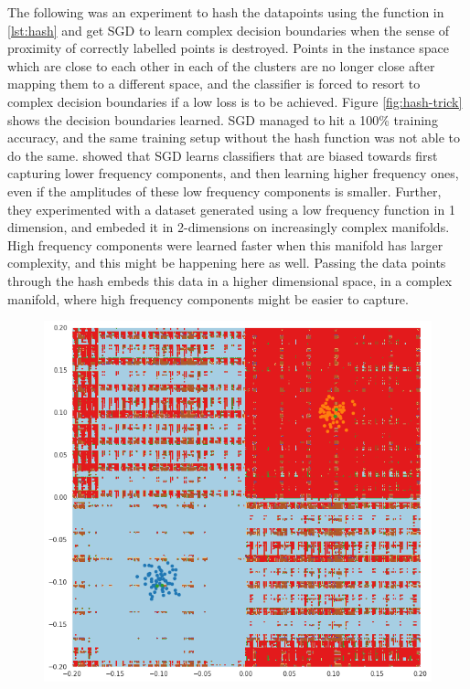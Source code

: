 \documentclass{ociamthesis}
\begin{document}
\begin{appendices}
The following was an experiment to hash the datapoints using the function in
\cref{lst:hash} and get SGD to learn complex decision boundaries when the sense
of proximity of correctly labelled points is destroyed. Points in the instance
space which are close to each other in each of the clusters are no longer close
after mapping them to a different space, and the classifier is forced to resort
to complex decision boundaries if a low loss is to be achieved. Figure
\ref{fig:hash-trick} shows the decision boundaries learned. SGD managed to hit a
100\% training accuracy, and the same training setup without the hash function
was not able to do the same.
\citet{rahaman2019spectral} showed that SGD learns classifiers that are biased
towards first capturing lower frequency components, and then learning higher
frequency ones, even if the amplitudes of these low frequency components is
smaller. Further, they experimented with a dataset generated using a low
frequency function in 1 dimension, and embeded it in 2-dimensions on
increasingly complex manifolds. High frequency components were learned faster
when this manifold has larger complexity, and this might be happening here as
well. Passing the data points through the hash embeds this data in a higher
dimensional space, in a complex manifold, where high frequency components might
be easier to capture.
\begin{figure}[!htb]
    \centering
    \includegraphics[scale=0.6]{hash_trick}

\end{figure}
\end{appendices}
\end{document}
